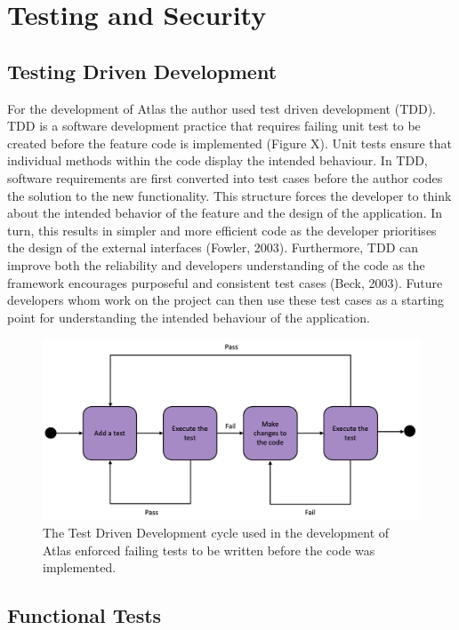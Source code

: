 \documentclass{article}
\begin{document}
\newpage
\section{Testing and Security}
\subsection{Testing Driven Development}

For the development of Atlas the author used test driven development (TDD). TDD is a software development practice that requires failing unit test to be created before the feature code is implemented (Figure X). Unit tests ensure that individual methods within the code display the intended behaviour. In TDD, software requirements are first converted into test cases before the author codes the solution to the new functionality. This structure forces the developer to think about the intended behavior of the feature and the design of the application. In turn, this results in simpler and more efficient code as the developer prioritises the design of the external interfaces (Fowler, 2003). Furthermore, TDD can improve both the reliability and developers understanding of the code as the framework encourages purposeful and consistent test cases (Beck, 2003). Future developers whom work on the project can then use these test cases as a starting point for understanding the intended behaviour of the application.

\begin{figure}[!htb]
  \centering
      \includegraphics[width=1\textwidth]{images/tdd.png}
  \caption{The Test Driven Development cycle used in the development of Atlas enforced failing tests to be written before the code was implemented.}
\end{figure}

\subsection{Functional Tests}
\end{document}
